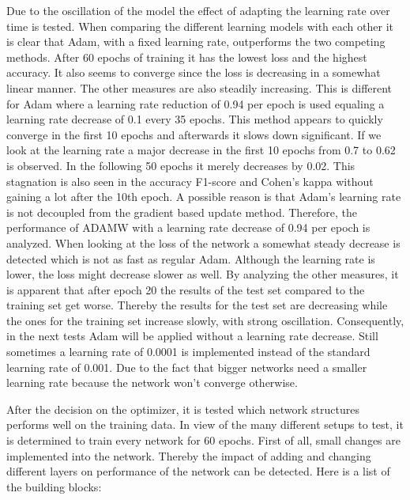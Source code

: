 \documentclass[
a4paper, 
12pt,
grayscalebody, %
abstract=on,
twoside, BCOR10mm, 12pt, DIV13,headinclude, footexclude, final, abstracton, openright
]{ibireprt}
\numberwithin{equation}{chapter}
\numberwithin{table}{chapter}
\numberwithin{figure}{chapter}
\numberwithin{algorithm}{chapter}
\numberwithin{example}{chapter}
\numberwithin{example}{chapter}
\begin{document}
Due to the oscillation of the model the effect of adapting the learning rate over time is tested. When comparing the different learning models with each other it is clear that Adam, with a fixed learning rate, outperforms the two competing methods. After 60 epochs of training it has the lowest loss and the highest accuracy. It also seems to converge since the loss is decreasing in a somewhat linear manner. The other measures are also steadily increasing. This is different for Adam where a learning rate reduction of 0.94 per epoch is used equaling a learning rate decrease of 0.1 every 35 epochs. This method appears to quickly converge in the first 10 epochs and afterwards it slows down significant. If we look at the learning rate a major decrease in the first 10 epochs from 0.7 to 0.62 is observed. In the following 50 epochs it merely decreases by 0.02. This stagnation is also seen in the accuracy F1-score and Cohen's kappa without gaining a lot after the 10th epoch. A possible reason is that Adam's learning rate is not decoupled from the gradient based update method. Therefore, the performance of ADAMW with a learning rate decrease of 0.94 per epoch is analyzed. When looking at the loss of the network a somewhat steady decrease is detected which is not as fast as regular Adam. Although the learning rate is lower, the loss might decrease slower as well. By analyzing the other measures, it is apparent that after epoch 20 the results of the test set compared to the training set get worse. Thereby the results for the test set are decreasing while the ones for the training set increase slowly, with strong oscillation. Consequently, in the next tests Adam will be applied without a learning rate decrease. Still sometimes a learning rate of 0.0001 is implemented instead of the standard learning rate of 0.001. Due to the fact that bigger networks need a smaller learning rate because the network won't converge otherwise.



After the decision on the optimizer, it is tested which network structures performs well on the training data. In view of the many different setups to test, it is determined to train every network for 60 epochs. First of all, small changes are implemented into the network. Thereby the impact of adding and changing different layers on performance of the network can be detected. Here is a list of the building blocks:
\end{document}
